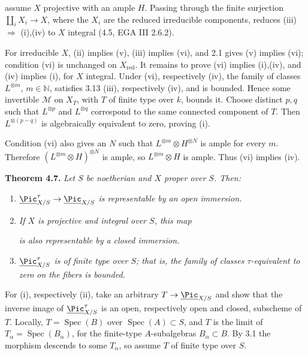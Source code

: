assume \(X\) projective with an ample \(H\). Passing through the finite
surjection \(\coprod_iX_i\to X\), where the \(X_i\) are the reduced
irreducible components, reduces (iii) \(\Rightarrow\) (i),(iv) to \(X\)
integral (4.5, EGA III 2.6.2).

For irreducible \(X\), (ii) implies (v), (iii) implies (vi), and 2.1
gives (v) implies (vi); condition (vi) is unchanged on
\(X_{\mathrm{red}}\). It remains to prove (vi) implies (i),(iv), and
(iv) implies (i), for \(X\) integral. Under (vi), respectively (iv), the
family of classes \(L^{\otimes m}\), \(m\in\mathbb N\), satisfies 3.13
(iii), respectively (iv), and is bounded. Hence some invertible
\(\mathcal M\) on \(X_T\), with \(T\) of finite type over \(k\), bounds
it. Choose distinct \(p,q\) such that \(L^{\otimes p}\) and
\(L^{\otimes q}\) correspond to the same connected component of \(T\).
Then \(L^{\otimes(p-q)}\) is algebraically equivalent to zero, proving
(i).

Condition (vi) also gives an \(N\) such that
\(L^{\otimes m}\otimes H^{\otimes N}\) is ample for every \(m\).
Therefore \((L^{\otimes m}\otimes H)^{\otimes N}\) is ample, so
\(L^{\otimes m}\otimes H\) is ample. Thus (vi) implies (iv).

\textbf{Theorem 4.7.} \emph{Let \(S\) be noetherian and \(X\) proper over
\(S\). Then:}
\begin{enumerate}[label=(\roman*)]
\item \emph{\(\underline{\Pic}^{\tau}_{X/S}\to
\underline{\Pic}_{X/S}\) is representable by an open immersion.}
\item \emph{If \(X\) is projective and integral over \(S\), this map}

\emph{is also representable by a closed immersion.}
\item \emph{\(\underline{\Pic}^{\tau}_{X/S}\) is of finite type over
\(S\); that is, the family of classes \(\tau\)-equivalent to zero on the
fibers is bounded.}
\end{enumerate}

For (i), respectively (ii), take an arbitrary
\(T\to\underline{\Pic}_{X/S}\) and show that the inverse image of
\(\underline{\Pic}^{\tau}_{X/S}\) is an open, respectively open and
closed, subscheme of \(T\). Locally, \(T=\operatorname{Spec}(B)\) over
\(\operatorname{Spec}(A)\subset S\), and \(T\) is the limit of
\(T_\alpha=\operatorname{Spec}(B_\alpha)\), for the finite-type
\(A\)-subalgebras \(B_\alpha\subset B\). By 3.1 the morphism descends to
some \(T_\alpha\), so assume \(T\) of finite type over \(S\).

